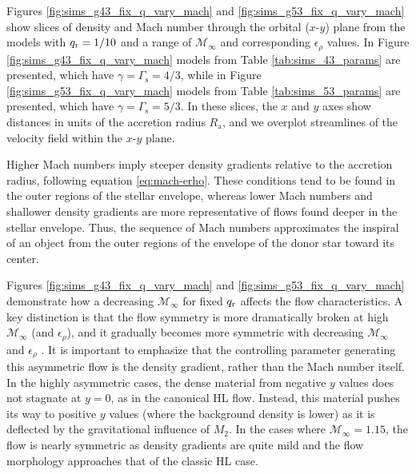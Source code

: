 Figures \ref{fig:sims_g43_fix_q_vary_mach} and \ref{fig:sims_g53_fix_q_vary_mach} show slices of density and Mach number through the orbital ($x$-$y$) plane from the models with $q_{\rm r} = 1/10$ and a range of $\mathcal{M}_\infty$ and corresponding $\epsilon_\rho$ values. In Figure \ref{fig:sims_g43_fix_q_vary_mach} models from Table \ref{tab:sims_43_params} are presented, which have $\gamma = \Gamma_{\mathrm s} = 4/3$, while in Figure \ref{fig:sims_g53_fix_q_vary_mach} models from Table \ref{tab:sims_53_params} are presented, which have $\gamma = \Gamma_{\mathrm s} = 5/3$. In these slices, the $x$ and $y$ axes show distances in units of the accretion radius $R_{\mathrm{a}}$, and we overplot streamlines of the velocity field within the $x$-$y$ plane. 


Higher Mach numbers imply steeper density gradients relative to the accretion radius, following equation \eqref{eq:mach-erho}.  These conditions tend to be found in the outer regions of the stellar envelope, whereas lower Mach numbers and shallower density gradients are more representative of flows found deeper in the stellar envelope. Thus, the sequence of Mach numbers approximates the inspiral of an object from the outer regions of the envelope of the donor star toward its center.


Figures \ref{fig:sims_g43_fix_q_vary_mach} and \ref{fig:sims_g53_fix_q_vary_mach} demonstrate how a decreasing $\mathcal{M}_\infty$ for fixed $q_{\rm r}$ affects the flow characteristics. A key distinction is that the flow symmetry is more dramatically broken at high $\mathcal{M}_\infty$ (and $\epsilon_{\rho}$), and it gradually becomes more symmetric with decreasing $\mathcal{M}_\infty$ and $\epsilon_{\rho}$ \cite{MacLeod_2015,MacLeod:2017}. It is important to emphasize that the controlling parameter generating this asymmetric flow is the density gradient, rather than the Mach number itself. In the highly asymmetric cases, the dense material from negative $y$ values does not stagnate at $y=0$, as in the canonical HL flow. Instead, this material pushes its way to positive $y$ values (where the background density is lower) as it is deflected by the gravitational influence of $M_2$. In the cases where  $\mathcal{M}_\infty = 1.15$, the flow is nearly symmetric as density gradients are quite mild and the flow morphology approaches that of the classic HL case.


